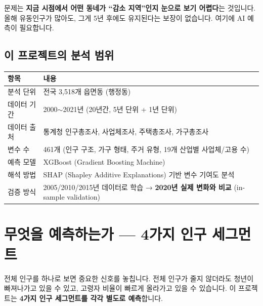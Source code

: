 \documentclass[11pt, a4paper]{article}
\begin{document}
문제는 \textbf{지금 시점에서 어떤 동네가 ``감소 지역''인지 눈으로 보기 어렵다}는 것입니다. 올해 유동인구가 많아도, 그게 5년 후에도 유지된다는 보장이 없습니다. 여기에 AI 예측이 필요합니다.

\subsection{이 프로젝트의 분석 범위}

\begin{table}[H]
\centering
\renewcommand{\arraystretch}{1.2}
\begin{tabularx}{\textwidth}{L{4cm} X}
\toprule
{} \textbf{항목} & \textbf{내용} \\
\midrule
분석 단위 & 전국 3,518개 읍면동 (행정동) \\
데이터 기간 & 2000$\sim$2021년 (20년간, 5년 단위 + 1년 단위) \\
데이터 출처 & 통계청 인구총조사, 사업체조사, 주택총조사, 가구총조사 \\
변수 수 & 461개 (인구 구조, 가구 형태, 주거 유형, 19개 산업별 사업체/고용 수) \\
예측 모델 & XGBoost (Gradient Boosting Machine) \\
해석 방법 & SHAP (Shapley Additive Explanations) 기반 변수 기여도 분석 \\
검증 방식 & 2005/2010/2015년 데이터로 학습 → \textbf{2020년 실제 변화와 비교} (in-sample validation) \\
\bottomrule
\end{tabularx}
\end{table}

\newpage

\section{무엇을 예측하는가 — 4가지 인구 세그먼트}

전체 인구를 하나로 보면 중요한 신호를 놓칩니다. 전체 인구가 줄지 않더라도 청년이 빠져나가고 있을 수 있고, 고령자 비율이 빠르게 올라가고 있을 수 있습니다. 이 프로젝트는 \textbf{4가지 인구 세그먼트를 각각 별도로 예측}합니다.
\end{document}
